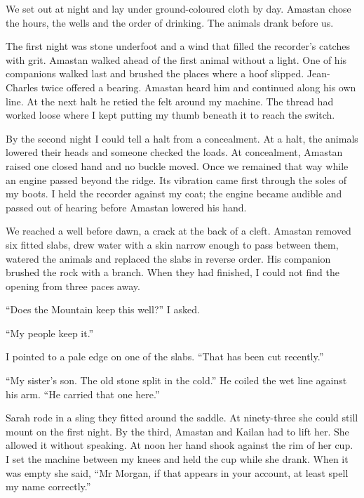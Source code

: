 We set out at night and lay under ground-coloured cloth by day. Amastan chose the hours, the wells and the order of drinking. The animals drank before us.\par

The first night was stone underfoot and a wind that filled the recorder's catches with grit. Amastan walked ahead of the first animal without a light. One of his companions walked last and brushed the places where a hoof slipped. Jean-Charles twice offered a bearing. Amastan heard him and continued along his own line. At the next halt he retied the felt around my machine. The thread had worked loose where I kept putting my thumb beneath it to reach the switch.\par

By the second night I could tell a halt from a concealment. At a halt, the animals lowered their heads and someone checked the loads. At concealment, Amastan raised one closed hand and no buckle moved. Once we remained that way while an engine passed beyond the ridge. Its vibration came first through the soles of my boots. I held the recorder against my coat; the engine became audible and passed out of hearing before Amastan lowered his hand.\par

We reached a well before dawn, a crack at the back of a cleft. Amastan removed six fitted slabs, drew water with a skin narrow enough to pass between them, watered the animals and replaced the slabs in reverse order. His companion brushed the rock with a branch. When they had finished, I could not find the opening from three paces away.\par

``Does the Mountain keep this well?'' I asked.\par

``My people keep it.''\par

I pointed to a pale edge on one of the slabs. ``That has been cut recently.''\par

``My sister's son. The old stone split in the cold.'' He coiled the wet line against his arm. ``He carried that one here.''\par

Sarah rode in a sling they fitted around the saddle. At ninety-three she could still mount on the first night. By the third, Amastan and Kailan had to lift her. She allowed it without speaking. At noon her hand shook against the rim of her cup. I set the machine between my knees and held the cup while she drank. When it was empty she said, ``Mr Morgan, if that appears in your account, at least spell my name correctly.''\par

